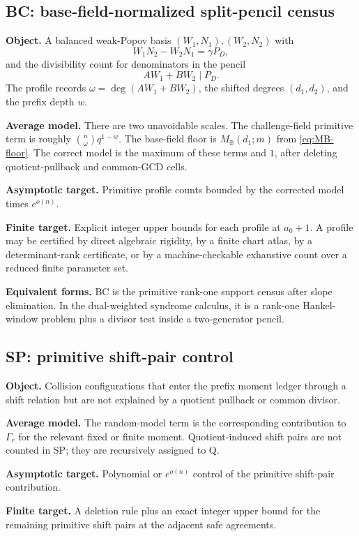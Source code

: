 \documentclass[11pt]{article}
\theoremstyle{definition}
\theoremstyle{remark}
\newcommand{\BB}{\mathbb B}
\begin{document}
\subsection*{BC: base-field-normalized split-pencil census}

\textbf{Object.}  A balanced weak-Popov basis \((W_1,N_1),(W_2,N_2)\) with
\[
        W_1N_2-W_2N_1=\gamma P_D,
\]
and the divisibility count for denominators in the pencil
\[
        AW_1+BW_2\mid P_D.
\]
The profile records \(\omega=\deg(AW_1+BW_2)\), the shifted degrees \((d_1,d_2)\), and the prefix depth \(w\).

\textbf{Average model.}  There are two unavoidable scales.  The challenge-field primitive term is roughly \(\binom n\omega q^{1-w}\).  The base-field floor is \(M_{\BB}(d_1;m)\) from \eqref{eq:MB-floor}.  The correct model is the maximum of these terms and \(1\), after deleting quotient-pullback and common-GCD cells.

\textbf{Asymptotic target.}  Primitive profile counts bounded by the corrected model times \(e^{o(n)}\).

\textbf{Finite target.}  Explicit integer upper bounds for each profile at \(a_0+1\).  A profile may be certified by direct algebraic rigidity, by a finite chart atlas, by a determinant-rank certificate, or by a machine-checkable exhaustive count over a reduced finite parameter set.

\textbf{Equivalent forms.}  BC is the primitive rank-one support census after slope elimination.  In the dual-weighted syndrome calculus, it is a rank-one Hankel-window problem plus a divisor test inside a two-generator pencil.

\subsection*{SP: primitive shift-pair control}

\textbf{Object.}  Collision configurations that enter the prefix moment ledger through a shift relation but are not explained by a quotient pullback or common divisor.

\textbf{Average model.}  The random-model term is the corresponding contribution to \(\Gamma_r\) for the relevant fixed or finite moment.  Quotient-induced shift pairs are not counted in SP; they are recursively assigned to Q.

\textbf{Asymptotic target.}  Polynomial or \(e^{o(n)}\) control of the primitive shift-pair contribution.

\textbf{Finite target.}  A deletion rule plus an exact integer upper bound for the remaining primitive shift pairs at the adjacent safe agreements.
\end{document}
